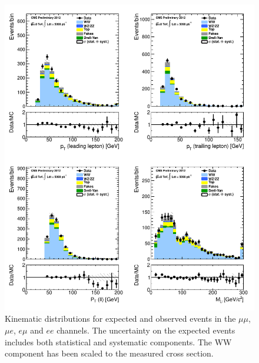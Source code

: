 \begin{figure}[!hbtp]
\centering
\includegraphics[width=1\textwidth]{figures/ww_analysis20_0_ALL_incl_0j.pdf} %
\caption{Kinematic distributions for expected and observed events in the  $\mu\mu$, $\mu{e}$, $e\mu$ and $ee$ channels.
The uncertainty on the expected events includes both statistical and systematic components.
The WW component has been scaled to the measured cross section.}
\label{fig:xs_kinematics}
\end{figure}

